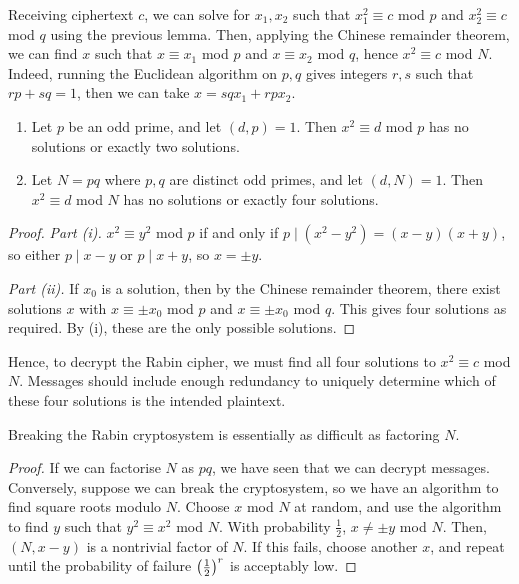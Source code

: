 Receiving ciphertext \( c \), we can solve for \( x_1, x_2 \) such that \( x_1^2 \equiv c \) mod \( p \) and \( x_2^2 \equiv c \) mod \( q \) using the previous lemma.
Then, applying the Chinese remainder theorem, we can find \( x \) such that \( x \equiv x_1 \) mod \( p \) and \( x \equiv x_2 \) mod \( q \), hence \( x^2 \equiv c \) mod \( N \).
Indeed, running the Euclidean algorithm on \( p, q \) gives integers \( r, s \) such that \( rp + sq = 1 \), then we can take \( x = sqx_1 + rpx_2 \).
\begin{lemma}
    \begin{enumerate}
        \item Let \( p \) be an odd prime, and let \( (d, p) = 1 \).
        Then \( x^2 \equiv d \) mod \( p \) has no solutions or exactly two solutions.
        \item Let \( N = pq \) where \( p, q \) are distinct odd primes, and let \( (d, N) = 1 \).
        Then \( x^2 \equiv d \) mod \( N \) has no solutions or exactly four solutions.
    \end{enumerate}
\end{lemma}
\begin{proof}
    \emph{Part (i).}
    \( x^2 \equiv y^2 \) mod \( p \) if and only if \( p \mid (x^2 - y^2) = (x-y)(x+y) \), so either \( p \mid x-y \) or \( p \mid x+y \), so \( x = \pm y \).
    
    \emph{Part (ii).}
    If \( x_0 \) is a solution, then by the Chinese remainder theorem, there exist solutions \( x \) with \( x \equiv \pm x_0 \) mod \( p \) and \( x \equiv \pm x_0 \) mod \( q \).
    This gives four solutions as required.
    By (i), these are the only possible solutions.
\end{proof}
Hence, to decrypt the Rabin cipher, we must find all four solutions to \( x^2 \equiv c \) mod \( N \).
Messages should include enough redundancy to uniquely determine which of these four solutions is the intended plaintext.
\begin{theorem}
    Breaking the Rabin cryptosystem is essentially as difficult as factoring \( N \).
\end{theorem}
\begin{proof}
    If we can factorise \( N \) as \( pq \), we have seen that we can decrypt messages.
    Conversely, suppose we can break the cryptosystem, so we have an algorithm to find square roots modulo \( N \).
    Choose \( x \) mod \( N \) at random, and use the algorithm to find \( y \) such that \( y^2 \equiv x^2 \) mod \( N \).
    With probability \( \frac{1}{2} \), \( x \neq \pm y \) mod \( N \).
    Then, \( (N, x-y) \) is a nontrivial factor of \( N \).
    If this fails, choose another \( x \), and repeat until the probability of failure \( \qty(\frac{1}{2})^r \) is acceptably low.
\end{proof}

